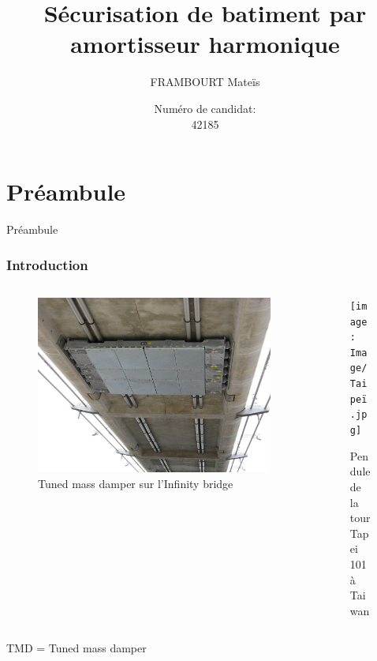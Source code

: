 \documentclass{beamer}
\title[]
{Sécurisation de batiment par amortisseur harmonique}
\subtitle{}
\author{FRAMBOURT Mateïs} %
\date[N°42185] %
{Numéro de candidat:\\ 42185}
\begin{document}
	
	\frame{\titlepage}
	\section{Préambule}
	\begin{frame}{Préambule}
		\frametitle{Introduction}
		
		
		\begin{columns}[T]
			\begin{column}{0.45\textwidth}
				\begin{figure}
					\centering
					\includegraphics[width=\textwidth]{Image/TMD pont.jpg}
					\caption{Tuned mass damper sur l'Infinity bridge}
				\end{figure}
				
			\end{column}
			\begin{column}{0.45\textwidth}
				\begin{figure}
					\centering
					\caption{ Pendule de la tour Tapei 101 à Taiwan}
					\texttt{[image: Image/Taipeï.jpg]}
				\end{figure}
			\end{column}
		\end{columns}
		\bigskip\small TMD = Tuned mass damper
	\end{frame}
	
\end{document}
